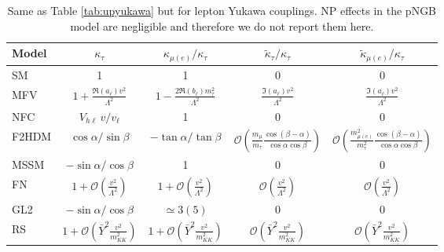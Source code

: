 \documentclass[../report.tex]{subfiles}
\newcommand{\mcO}{\mathcal{O}}
\newcommand{\yvmkk}{\bar Y^2 \frac{v^2}{m_{KK}^2}}
\begin{document}
\begin{table}[t]\centering
\begin{tabular}{ l   c  c c c}\toprule[0.1em]
Model	& $\kappa_\tau$ & $\kappa_{\mu(e)}/\kappa_\tau$ & $\tilde \kappa_\tau/\kappa_\tau$ & $\tilde \kappa_{\mu(e)}/\kappa_\tau$ \\ \midrule[0.05em]
SM & 1 & 1 & 0 & 0\\
MFV & $1+\frac{\Re\left(a_\ell\right) v^2}{\Lambda^2}$ &
	$1-\frac{2\Re{\left(b_\ell\right)}m_\tau^2}{\Lambda^2}$ &
	$\frac{\Im\left(a_\ell\right) v^2}{\Lambda^2}$ &
	$\frac{\Im\left(a_\ell\right) v^2}{\Lambda^2}$\\
NFC & $V_{h\ell}\,v/v_\ell$	& 1 &0 &0\\
F2HDM & $\cos\alpha/\sin\beta$	& $-\tan\alpha/\tan\beta$ & $\mcO\left(\frac{m_\mu}{m_\tau}\frac{\cos(\beta-\alpha)}{\cos\alpha\cos\beta}\right)$ & $\mcO\left(\frac{m_{\mu(e)}^2}{m_\tau^2} \frac{\cos(\beta-\alpha)}{\cos\alpha\cos\beta}\right)$ \\
MSSM & $-\sin\alpha/\cos\beta$ & 1 & 0 & 0 \\
FN & $1+\mathcal{O}\left(\frac{v^2}{\Lambda^2}\right)$ & $1+\mathcal{O}\left(\frac{v^2}{\Lambda^2}\right)$ & $\mathcal{O}\left(\frac{v^2}{\Lambda^2}\right)$  & $\mathcal{O}\left(\frac{v^2}{\Lambda^2}\right)$ \\
GL2 &  $-\sin\alpha/\cos\beta$ & $\simeq 3(5)$ & 0 & 0 \\
RS & $1+\mcO\left(\yvmkk\right)$ &
	$1+\mcO\left(\yvmkk\right)$ &
	$\mcO\left(\yvmkk\right)$ &
	$\mcO\left(\yvmkk\right)$ \\
\bottomrule[0.1em]
\end{tabular}
\caption{Same as Table \ref{tab:upyukawa} but for lepton Yukawa
  couplings. NP effects in the pNGB model are negligible and therefore we do not report them here.
}
\label{tab:leptyukawa}
\end{table}
\end{document}
